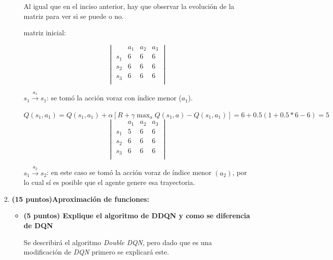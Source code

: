 \documentclass[a4paper,10pt]{article}
\begin{document}
\begin{enumerate}
\begin{itemize}
    Al igual que en el inciso anterior, hay que observar la evolución de la matriz para ver si se puede o no.
    
    matriz inicial:
    
	\[\begin{vmatrix}
        & a_1 & a_2 & a_3\\
        s_1 & 6 & 6 & 6\\
        s_2 & 6 & 6 & 6\\
        s_3 & 6 & 6 & 6\\
        \end{vmatrix}\]
        
$s_1 \xrightarrow{a_1} s_1$: se tomó la acción voraz con índice menor ($a_1$).

$Q(s_1, a_1) = Q(s_1, a_1) + \alpha [R + \gamma \max_a Q(s_1, a) - Q(s_1, a_1)] = 6 + 0.5(1 + 0.5*6 - 6) = 5$
    \[\begin{vmatrix}
        & a_1 & a_2 & a_3\\
        s_1 & 5 & 6 & 6\\
        s_2 & 6 & 6 & 6\\
        s_3 & 6 & 6 & 6\\
        \end{vmatrix}\]

$s_1 \xrightarrow{a_2} s_2$: en este caso se tomó la acción voraz de índice menor $(a_2)$, por lo cual sí es posible que el agente genere esa trayectoria.

    \end{itemize}

    \item \textbf{(15 puntos)Aproximación de funciones:}
    \begin{itemize}
	\item \textbf{(5 puntos) Explique el algoritmo de DDQN y como se diferencia de DQN}
	
	Se describirá el algoritmo \textit{Double DQN}, pero dado que es una modificación de \textit{DQN} primero se explicará este.
	

\end{itemize}
\end{enumerate}
\end{document}

